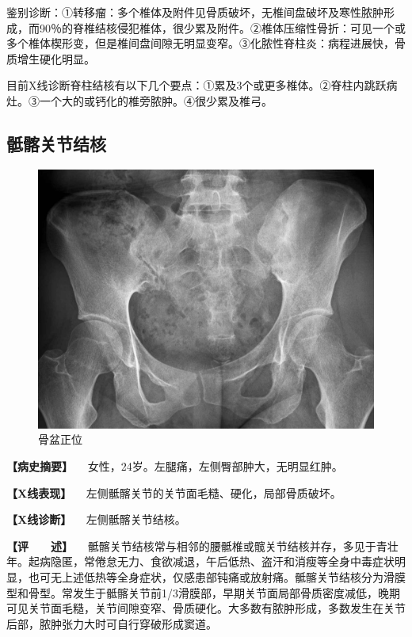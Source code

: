 鉴别诊断：①转移瘤：多个椎体及附件见骨质破坏，无椎间盘破坏及寒性脓肿形成，而90％的脊椎结核侵犯椎体，很少累及附件。②椎体压缩性骨折：可见一个或多个椎体楔形变，但是椎间盘间隙无明显变窄。③化脓性脊柱炎：病程进展快，骨质增生硬化明显。

目前X线诊断脊柱结核有以下几个要点：①累及3个或更多椎体。②脊柱内跳跃病灶。③一个大的或钙化的椎旁脓肿。④很少累及椎弓。

\subsection{骶髂关节结核}

\begin{figure}[!htbp]
 \centering
 \includegraphics{./images/Image00080.jpg}
 \captionsetup{justification=centering}
 \caption{骨盆正位}
 \label{fig2-6-5}
  \end{figure} 

\textbf{【病史摘要】} 　女性，24岁。左腿痛，左侧臀部肿大，无明显红肿。

\textbf{【X线表现】} 　左侧骶髂关节的关节面毛糙、硬化，局部骨质破坏。

\textbf{【X线诊断】} 　左侧骶髂关节结核。

\textbf{【评　　述】}
　骶髂关节结核常与相邻的腰骶椎或髋关节结核并存，多见于青壮年。起病隐匿，常倦怠无力、食欲减退，午后低热、盗汗和消瘦等全身中毒症状明显，也可无上述低热等全身症状，仅感患部钝痛或放射痛。骶髂关节结核分为滑膜型和骨型。常发生于骶髂关节前1/3滑膜部，早期关节面局部骨质密度减低，晚期可见关节面毛糙，关节间隙变窄、骨质硬化。大多数有脓肿形成，多数发生在关节后部，脓肿张力大时可自行穿破形成窦道。

